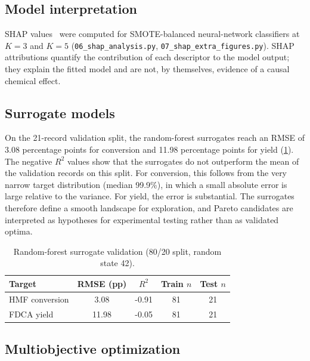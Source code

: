 \documentclass[10pt,a4paper]{article}
\newcommand{\ConvRMSE}{3.08}   \newcommand{\ConvRsq}{-0.91}
\newcommand{\YldRMSE}{11.98}   \newcommand{\YldRsq}{-0.05}
\begin{document}
\subsection{Model interpretation}
\label{sec:shap}

SHAP values~\cite{lundberg2017shap} were computed for SMOTE-balanced
neural-network classifiers at $K = 3$ and $K = 5$ (\texttt{06\_shap\_analysis.py},
\texttt{07\_shap\_extra\_figures.py}). SHAP attributions quantify the
contribution of each descriptor to the model output; they explain the fitted
model and are not, by themselves, evidence of a causal chemical effect.

\subsection{Surrogate models}
\label{sec:surrogate}

On the 21-record validation split, the random-forest surrogates reach an RMSE
of \ConvRMSE{} percentage points for conversion and \YldRMSE{} percentage points
for yield (\cref{tab:surrogate}). The negative $R^2$ values show that the
surrogates do not outperform the mean of the validation records on this split.
For conversion, this follows from the very narrow target distribution (median
99.9\%), in which a small absolute error is large relative to the variance.
For yield, the error is substantial. The surrogates therefore define a smooth
landscape for exploration, and Pareto candidates are interpreted as
hypotheses for experimental testing rather than as validated optima.

\begin{table}[t]
\centering
\caption{Random-forest surrogate validation (80/20 split, random state 42).}
\label{tab:surrogate}
\small
\begin{tabular}{lcccc}
\toprule
Target & RMSE (pp) & $R^2$ & Train $n$ & Test $n$ \\
\midrule
HMF conversion & \ConvRMSE & \ConvRsq & 81 & 21 \\
FDCA yield     & \YldRMSE  & \YldRsq  & 81 & 21 \\
\bottomrule
\end{tabular}
\end{table}

\subsection{Multiobjective optimization}
\label{sec:ga}
\end{document}
